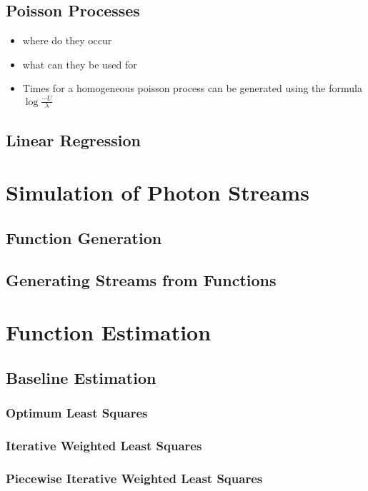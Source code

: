 \documentclass[a4paper,11pt]{article}
\begin{document}
\subsection{Poisson Processes}
\label{sec-2-3}

\begin{itemize}
\item where do they occur
\item what can they be used for
\item Times for a homogeneous poisson process can be generated using
     the formula $\log\frac{-U}{\lambda}$
\end{itemize}
\subsection{Linear Regression}
\label{sec-2-4}
\section{Simulation of Photon Streams}
\label{sec-3}
\subsection{Function Generation}
\label{sec-3-1}
\subsection{Generating Streams from Functions}
\label{sec-3-2}
\section{Function Estimation}
\label{sec-4}
\subsection{Baseline Estimation}
\label{sec-4-1}
\subsubsection{Optimum Least Squares}
\label{sec-4-1-1}
\subsubsection{Iterative Weighted Least Squares}
\label{sec-4-1-2}
\subsubsection{Piecewise Iterative Weighted Least Squares}
\label{sec-4-1-3}
\end{document}
